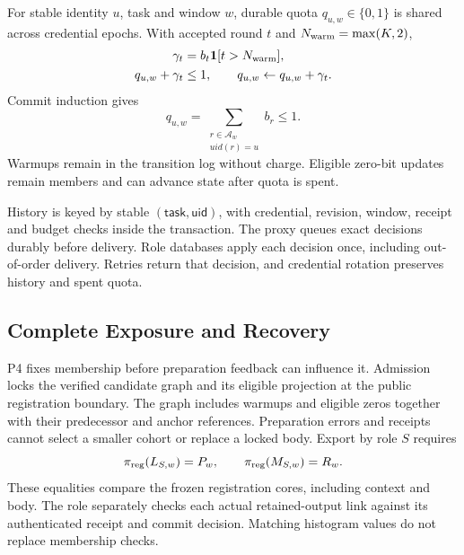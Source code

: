 \documentclass[conference,compsoc]{IEEEtran}
\theoremstyle{definition}
\numberwithin{equation}{section}
\numberwithin{table}{section}
\numberwithin{figure}{section}
\theoremstyle{plain}
\begin{document}
For stable identity \(u\), task and window \(w\), durable quota
\(q_{u,w}\in\{0,1\}\) is shared across credential epochs. With accepted round
\(t\) and \(N_{\rm warm}=\max(K,2)\),
\begin{equation}
\begin{aligned}
\gamma_t&=b_t\mathbf1[t>N_{\rm warm}],\\
q_{u,w}+\gamma_t&\le1,\qquad
q_{u,w}\gets q_{u,w}+\gamma_t.
\end{aligned}
\label{eq:window-quota}
\end{equation}
Commit induction gives
\begin{equation}
q_{u,w}=\sum_{\substack{r\in\mathcal A_w\\uid(r)=u}} b_r\le1.
\label{eq:quota-invariant}
\end{equation}
Warmups remain in the transition log without charge. Eligible zero-bit updates
remain members and can advance state after quota is spent.

History is keyed by stable \((\mathsf{task},\mathsf{uid})\), with credential,
revision, window, receipt and budget checks inside the transaction. The proxy
queues exact decisions durably before delivery. Role databases apply each
decision once, including out-of-order delivery. Retries return that decision,
and credential rotation preserves history and spent quota.

\subsection{Complete Exposure and Recovery}
\label{sec:finalization}
\label{sec:strict-choice}

P4 fixes membership before preparation feedback can influence it. Admission
locks the verified candidate graph and its eligible projection at the public
registration boundary. The graph includes warmups and eligible zeros together
with their predecessor and anchor references. Preparation errors and receipts cannot select a smaller cohort or replace
a locked body. Export by role \(S\) requires
\begin{equation}
 \pi_{\rm reg}(L_{S,w})=P_w,\qquad \pi_{\rm reg}(M_{S,w})=R_w.
 \label{eq:final-report-set}
\end{equation}
These equalities compare the frozen registration cores, including context and
body. The role separately checks each actual retained-output link against its
authenticated receipt and commit decision. Matching histogram values do not replace membership checks.
\end{document}
